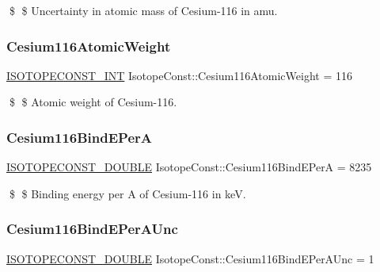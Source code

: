 \$ \$ Uncertainty in atomic mass of Cesium-\/116 in amu. \mbox{\label{group___isotope_const-_cesium-_cs116_gad20853c922ad3d8b715bbd5ee8a363e9}} 
\subsubsection{\texorpdfstring{Cesium116\+Atomic\+Weight}{Cesium116AtomicWeight}}
{\footnotesize\ttfamily \mbox{\hyperlink{group___isotope_const-_macros_ga5f18360b3e99483a35c32d789e62621c}{I\+S\+O\+T\+O\+P\+E\+C\+O\+N\+S\+T\+\_\+\+I\+NT}} Isotope\+Const\+::\+Cesium116\+Atomic\+Weight = 116}

\$ \$ Atomic weight of Cesium-\/116. \mbox{\label{group___isotope_const-_cesium-_cs116_ga6f1fe6422889ce73debd548b11f6fd00}} 
\subsubsection{\texorpdfstring{Cesium116\+Bind\+E\+PerA}{Cesium116BindEPerA}}
{\footnotesize\ttfamily \mbox{\hyperlink{group___isotope_const-_macros_ga8f45a7272ce02c0b4c65c44636ed719a}{I\+S\+O\+T\+O\+P\+E\+C\+O\+N\+S\+T\+\_\+\+D\+O\+U\+B\+LE}} Isotope\+Const\+::\+Cesium116\+Bind\+E\+PerA = 8235}

\$ \$ Binding energy per A of Cesium-\/116 in keV. \mbox{\label{group___isotope_const-_cesium-_cs116_gad51e1483009474a35d4fba3184a90849}} 
\subsubsection{\texorpdfstring{Cesium116\+Bind\+E\+Per\+A\+Unc}{Cesium116BindEPerAUnc}}
{\footnotesize\ttfamily \mbox{\hyperlink{group___isotope_const-_macros_ga8f45a7272ce02c0b4c65c44636ed719a}{I\+S\+O\+T\+O\+P\+E\+C\+O\+N\+S\+T\+\_\+\+D\+O\+U\+B\+LE}} Isotope\+Const\+::\+Cesium116\+Bind\+E\+Per\+A\+Unc = 1}

